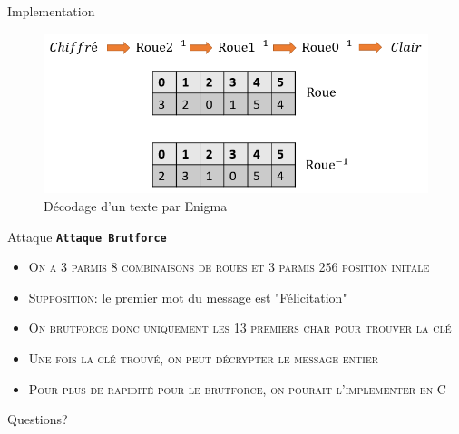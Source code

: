 \documentclass[10pt]{beamer}
\begin{document}
\begin{frame}{Implementation}
    \begin{figure}
        \includegraphics[scale=0.5]{enigma2.PNG}
        \caption{Décodage d'un texte par Enigma}
  \end{figure}
  
\end{frame}

\begin{frame}{Attaque}
  \alert{\texttt{\textbf{Attaque Brutforce}}}
	\begin{itemize}
    \item \textsc{On a 3 parmis 8 combinaisons de roues et 3 parmis 256 position initale }
    \item \textsc{Supposition:} le premier mot du message est "Félicitation"
    \item \textsc{On brutforce donc uniquement les 13 premiers char pour trouver la clé}
    \item \textsc{Une fois la clé trouvé, on peut décrypter le message entier}
    \item \textsc{Pour plus de rapidité pour le brutforce, on pourait l'implementer en C}

  \end{itemize}
\end{frame}






{
\begin{frame}[standout]
  Questions?
\end{frame}
}

\appendix
\end{document}

